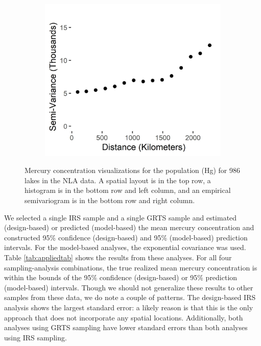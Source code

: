 \documentclass[]{elsarticle} %
\begin{document}
\begin{figure}
\begin{subfigure}{0.49\textwidth}
  \caption*{}
  \label{fig:mercury_hist}
\end{subfigure}
\begin{subfigure}{0.49\textwidth}
  \centering
  \includegraphics[width = 1\linewidth]{figures/sv_plot.jpeg}
  \caption*{}
  \label{fig:sv_plot}
\end{subfigure}
\caption{Mercury concentration visualizations for the population (Hg) for 986 lakes in the NLA data. A spatial layout is in the top row, a histogram is in the bottom row and left column, and an empirical semivariogram is in the bottom row and right column.}
\label{fig:merc}
\end{figure}

We selected a single IRS sample and a single GRTS sample and estimated
(design-based) or predicted (model-based) the mean mercury concentration
and constructed 95\% confidence (design-based) and 95\% (model-based)
prediction intervals. For the model-based analyses, the exponential
covariance was used. Table \ref{tab:appliedtab} shows the results from
these analyses. For all four sampling-analysis combinations, the true
realized mean mercury concentration is within the bounds of the 95\%
confidence (design-based) or 95\% prediction (model-based) intervals.
Though we should not generalize these results to other samples from
these data, we do note a couple of patterns. The design-based IRS
analysis shows the largest standard error: a likely reason is that this
is the only approach that does not incorporate any spatial locations.
Additionally, both analyses using GRTS sampling have lower standard
errors than both analyses using IRS sampling.
\end{document}
